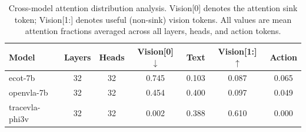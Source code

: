 \begin{table}[htbp]
  \centering
  \caption{Cross-model attention distribution analysis. Vision[0] denotes the attention sink token; Vision[1:] denotes useful (non-sink) vision tokens. All values are mean attention fractions averaged across all layers, heads, and action tokens.}
  \label{tab:cross_model_sink}
  \begin{tabular}{lcccccc}
    \toprule
    Model & Layers & Heads & Vision[0] $\downarrow$ & Text & Vision[1:] $\uparrow$ & Action \\
    \midrule
    ecot-7b & 32 & 32 & 0.745 & 0.103 & 0.087 & 0.065 \\
    openvla-7b & 32 & 32 & 0.454 & 0.400 & 0.097 & 0.049 \\
    tracevla-phi3v & 32 & 32 & 0.002 & 0.388 & 0.610 & 0.000 \\
    \bottomrule
  \end{tabular}
\end{table}